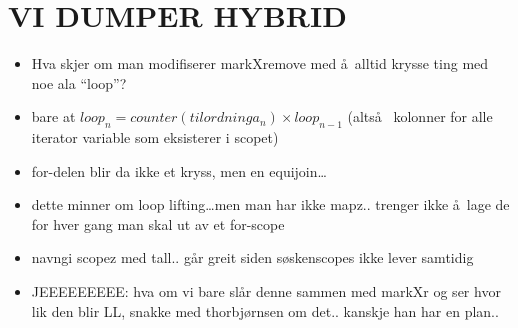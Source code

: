\section{VI DUMPER HYBRID}
\begin{itemize}
  \item Hva skjer om man modifiserer markXremove med \aa~alltid krysse ting med
  noe ala ``loop''?
  \item bare at $loop_{n} = counter(tilordninga_{n}) \times loop_{n-1}$
  (alts\aa~ kolonner for alle iterator variable som eksisterer i scopet)
  \item for-delen blir da ikke et kryss, men en equijoin\ldots
  \item dette minner om loop lifting\ldots men man har ikke mapz.. trenger ikke
  \aa~lage de for hver gang man skal ut av et for-scope
  \item navngi scopez med tall.. g\aa r greit siden s\o skenscopes ikke lever
  samtidig
  \item JEEEEEEEEE: hva om vi bare sl\aa r denne sammen med markXr og ser hvor lik den blir LL, snakke med
  thorbj\o rnsen om det.. kanskje han har en plan..
\end{itemize}

